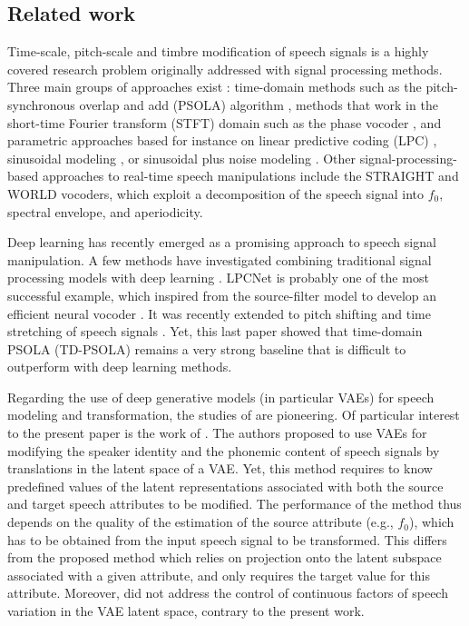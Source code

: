 \documentclass[review]{elsarticle}
\begin{document}
\subsection{Related work}
\label{sec:relatedwork}

Time-scale, pitch-scale and timbre modification of speech signals is a highly covered research problem originally addressed with signal processing methods. Three main groups of approaches exist \citep{laroche2002time}: time-domain methods such as the pitch-synchronous overlap and add (PSOLA) algorithm \citep{moulines1990pitch}, methods that work in the short-time Fourier transform (STFT) domain such as the phase vocoder \citep{flanagan1966phase, laroche1999improved}, and parametric approaches based for instance on linear predictive coding (LPC) \citep{makhoul1975linear, markel1976linear}, sinusoidal modeling \citep{mcaulay1986speech, george1997speech}, or sinusoidal plus noise modeling \citep{serra1990spectral, laroche1993hns}. Other signal-processing-based approaches to real-time speech manipulations include the STRAIGHT \citep{kawahara2006straight, banno2007implementation} and WORLD \citep{morise2016world} vocoders, which exploit a decomposition of the speech signal into $f_0$, spectral envelope, and aperiodicity.

Deep learning has recently emerged as a promising approach to speech signal manipulation. A few methods have investigated combining traditional signal processing models with deep learning \citep{valin2019lpcnet, wang2019neural, juvela2019glotnet, Lee2019AdversariallyTE, choi2021neural}. LPCNet is probably one of the most successful example, which inspired from the source-filter model to develop an efficient neural vocoder \citep{valin2019lpcnet}. It was recently extended to pitch shifting and time stretching of speech signals \citep{morrison2021neural}. Yet, this last paper showed that time-domain PSOLA (TD-PSOLA) \citep{moulines1990pitch} remains a very strong baseline that is difficult to outperform with deep learning methods. 

Regarding the use of deep generative models (in particular VAEs) for speech modeling and transformation, the studies of \citet{blaauw2016modeling, hsu2016voice,HsuUnsupervised2017,hsu2017learning,akuzawa2018expressive} are pioneering. Of particular interest to the present paper is the work of \cite{hsu2017learning}. The authors proposed to use VAEs for modifying the speaker identity and the phonemic content of speech signals by translations in the latent space of a VAE. Yet, this method requires to know predefined values of the latent representations associated with both the source and target speech attributes to be modified. The performance of the method thus depends on the quality of the estimation of the source attribute (e.g., $f_0$), which has to be obtained from the input speech signal to be transformed. This differs from the proposed method which relies on projection onto the latent subspace associated with a given attribute, and only requires the target value for this attribute. Moreover, \citet{hsu2017learning} did not address the control of continuous factors of speech variation in the VAE latent space, contrary to the present work.
\end{document}
